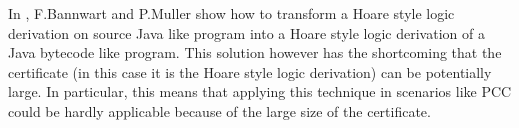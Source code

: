  


 In \cite{FB04LBT}, F.Bannwart and P.Muller show how to transform a Hoare style logic derivation on source Java like
 program into a Hoare style logic derivation of a Java bytecode like program. This solution however has the shortcoming
that the certificate (in this case it is the Hoare style logic derivation) can be potentially large. In particular, this means that
applying this technique in scenarios like PCC could be hardly applicable because of the large size of the certificate. 
    


